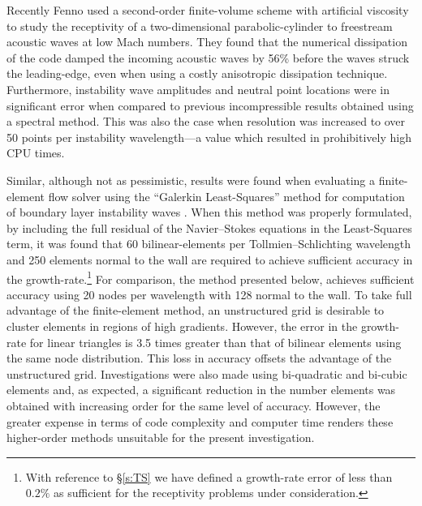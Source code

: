 Recently Fenno \etal \cite{Fenno:93} used a second-order finite-volume scheme
with artificial viscosity to study the receptivity of a two-dimensional
parabolic-cylinder to freestream acoustic waves at low Mach numbers.  They
found that the numerical dissipation of the code damped the incoming acoustic
waves by 56\% before the waves struck the leading-edge, even when using a
costly anisotropic dissipation technique.  Furthermore, instability wave
amplitudes and neutral point locations were in significant error when compared
to previous incompressible results obtained using a spectral method.  This was
also the case when resolution was increased to over 50 points per instability
wavelength---a value which resulted in prohibitively high CPU times.

Similar, although not as pessimistic, results were found when evaluating a
finite-element flow solver using the ``Galerkin Least-Squares'' method
\cite{Shakib:88} for computation of boundary layer instability waves
\cite{CoLe:96}.  When this method was properly formulated, by including the
full residual of the Navier--Stokes equations in the Least-Squares term, it was
found that 60 bilinear-elements per Tollmien--Schlichting wavelength and 250
elements normal to the wall are required to achieve sufficient accuracy in the
growth-rate.\footnote{With reference to \protect\S\ref{s:TS} we have defined a
growth-rate error of less than $0.2\%$ as sufficient for the receptivity
problems under consideration.}  For comparison, the method presented below,
achieves sufficient accuracy using 20 nodes per wavelength with 128 normal to
the wall.  To take full advantage of the finite-element method, an
unstructured grid is desirable to cluster elements in regions of high
gradients.  However, the error in the growth-rate for linear triangles is 3.5
times greater than that of bilinear elements using the same node distribution.
This loss in accuracy offsets the advantage of the unstructured grid.
Investigations were also made using bi-quadratic and bi-cubic elements and, as
expected, a significant reduction in the number elements was obtained with
increasing order for the same level of accuracy.  However, the greater expense
in terms of code complexity and computer time renders these higher-order
methods unsuitable for the present investigation.

